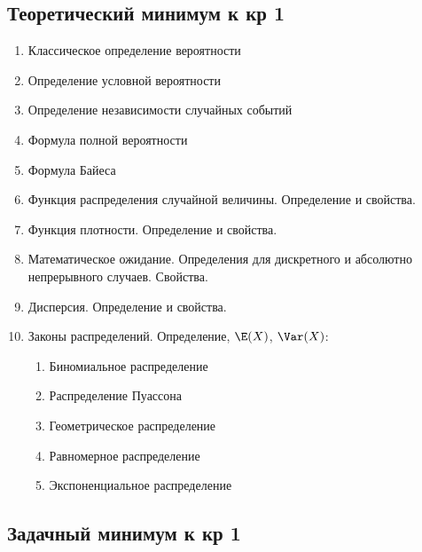 \subsection{Теоретический минимум к кр 1}


\begin{enumerate}
	\item Классическое определение вероятности
	\item Определение условной вероятности
	\item Определение независимости случайных событий
	\item Формула полной вероятности
	\item Формула Байеса
	\item Функция распределения случайной величины. Определение и свойства.
	\item Функция плотности. Определение и свойства.
	\item Математическое ожидание. Определения для дискретного и абсолютно непрерывного случаев. Свойства.
	\item Дисперсия. Определение и свойства.
	\item Законы распределений. Определение, $\E(X)$, $\Var(X)$:
	\begin{enumerate}
	\item Биномиальное распределение
	\item Распределение Пуассона
	\item Геометрическое распределение
	\item Равномерное распределение
	\item Экспоненциальное распределение
	\end{enumerate}
\end{enumerate}


\subsection{Задачный минимум к кр 1}

